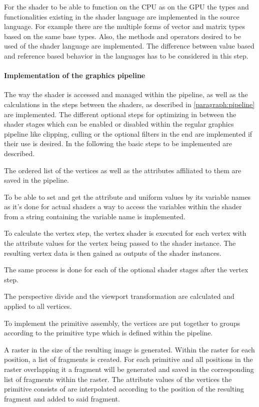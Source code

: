 For the shader to be able to function on the CPU as on the GPU the types and functionalities existing in the shader language are implemented in the source language. For example there are the multiple forms of vector and matrix types based on the same base types. Also, the methods and operators desired to be used of the shader language are implemented. The difference between value based and reference based behavior in the languages has to be considered in this step.

\paragraph{Implementation of the graphics pipeline}

The way the shader is accessed and managed within the pipeline,  as well as the calculations in the steps between the shaders, as described in \autoref{paragraph:pipeline} are implemented. The different optional steps for optimizing in between the shader stages which can be enabled or disabled within the regular graphics pipeline like clipping, culling or the optional filters in the end are implemented if their use is desired. In the following the basic steps to be implemented are described.

The ordered list of the vertices as well as the attributes affiliated to them are saved in the pipeline.

To be able to set and get the attribute and uniform values by its variable names as it's done for actual shaders  a way to access the variables within the shader from a string containing the variable name is implemented.

To calculate the vertex step, the vertex shader is executed for each vertex with the attribute values for the vertex being passed to the shader instance. The resulting vertex data is then gained as outputs of the shader instances.

The same process is done for each of the optional shader stages after the vertex step.

The perspective divide and the viewport transformation are calculated and applied to all vertices.

To implement the primitive assembly, the vertices are put together to groups according to the primitive type which is defined within the pipeline.

A raster in the size of the resulting image is generated. Within the raster for each position, a list of fragments is created. For each primitive and all positions in the raster overlapping it a fragment will be generated and saved in the corresponding list of fragments within the raster. The attribute values of the vertices the primitive consists of are interpolated according to the position of the resulting fragment and added to said fragment.

